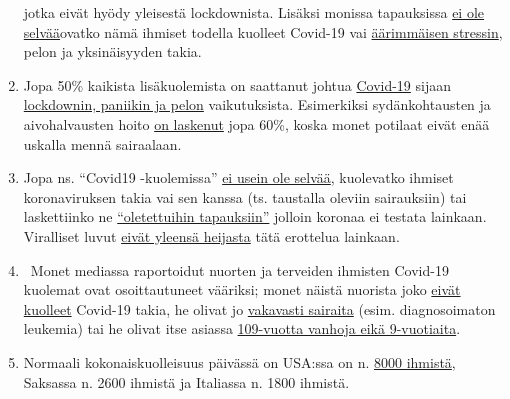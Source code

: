 \begin{enumerate}
  jotka eivät hyödy yleisestä lockdownista. Lisäksi monissa tapauksissa
  \href{https://www.hsj.co.uk/commissioning/thousands-of-extra-deaths-outside-hospital-not-attributed-to-covid-19/7027459.article}{ei
  ole selvää}ovatko nämä ihmiset todella kuolleet Covid-19 vai
  \href{https://www.nytimes.com/2020/04/16/world/canada/montreal-nursing-homes-coronavirus.html}{äärimmäisen
  stressin}, pelon ja yksinäisyyden takia.
\item
  Jopa 50\% kaikista lisäkuolemista on saattanut johtua
  \href{https://www.thetimes.co.uk/edition/news/coronavirus-record-weekly-death-toll-as-fearful-patients-avoid-hospitals-bm73s2tw3}{Covid-19}
  sijaan
  \href{https://www.telegraph.co.uk/global-health/science-and-disease/two-new-waves-deaths-break-nhs-new-analysis-warns/}{lockdownin,
  paniikin ja pelon} vaikutuksista. Esimerkiksi sydänkohtausten ja
  aivohalvausten hoito
  \href{https://www.nytimes.com/2020/04/06/well/live/coronavirus-doctors-hospitals-emergency-care-heart-attack-stroke.html}{on
  laskenut} jopa 60\%, koska monet potilaat eivät enää uskalla mennä
  sairaalaan.
\item
  Jopa ns. ``Covid19 -kuolemissa''
  \href{https://spectator.us/understand-report-figures-covid-deaths/}{ei
  usein ole selvää}, kuolevatko ihmiset koronaviruksen takia vai sen
  kanssa (ts. taustalla oleviin sairauksiin) tai laskettiinko ne
  \href{https://www.youtube.com/watch?v=V0lIWZpiRU0}{``oletettuihin
  tapauksiin''} jolloin koronaa ei testata lainkaan. Viralliset luvut
  \href{https://www.hsj.co.uk/coronavirus/systematic-reviews-to-discover-true-cause-of-outbreak-deaths/7027491.article}{eivät
  yleensä heijasta} tätä erottelua lainkaan.
\item
  ~Monet mediassa raportoidut nuorten ja terveiden ihmisten Covid-19
  kuolemat ovat osoittautuneet vääriksi; monet näistä nuorista joko
  \href{https://www.dailymail.co.uk/news/article-8193487/Coroner-refuses-rule-COVID-19-cause-death-six-week-old-Connecticut-baby.html}{eivät
  kuolleet} Covid-19 takia, he olivat jo
  \href{https://sports.yahoo.com/spanish-football-coach-francisco-garcia-163153573.html}{vakavasti
  sairaita} (esim. diagnosoimaton leukemia) tai he olivat itse asiassa
  \href{https://www.tagesanzeiger.ch/bund-muss-in-seiner-todesfallstatistik-fehler-korrigieren-584308129723}{109-vuotta
  vanhoja eikä 9-vuotiaita}.
\item
  Normaali kokonaiskuolleisuus päivässä on USA:ssa on n.
  \href{https://www.cdc.gov/mmwr/volumes/68/wr/mm6826a5.htm}{8000
  ihmistä}, Saksassa n. 2600 ihmistä ja Italiassa n. 1800 ihmistä.

\end{enumerate}
